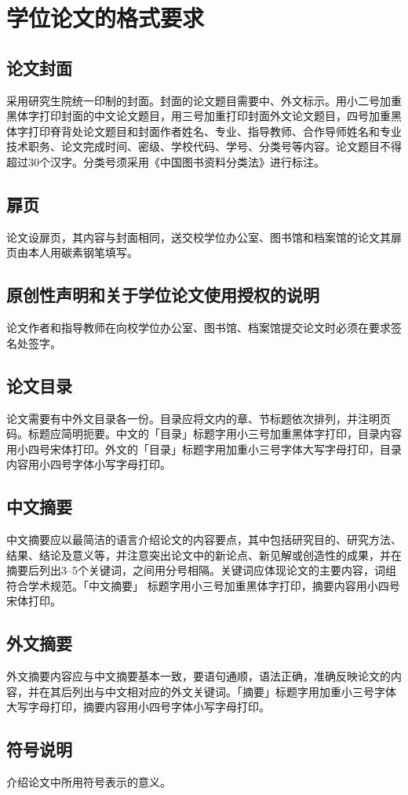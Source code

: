 \documentclass[openany]{sduthesis} %
\begin{document}
\section{学位论文的格式要求}
\subsection{论文封面}
采用研究生院统一印制的封面。封面的论文题目需要中、外文标示。用小二号加重黑体字打印封面的中文论文题目，用三号加重打印封面外文论文题目，四号加重黑体字打印脊背处论文题目和封面作者姓名、专业、指导教师、合作导师姓名和专业技术职务、论文完成时间、密级、学校代码、学号、分类号等内容。论文题目不得超过30个汉字。分类号须采用《中国图书资料分类法》进行标注。
\subsection{扉页}
论文设扉页，其内容与封面相同，送交校学位办公室、图书馆和档案馆的论文其扉页由本人用碳素钢笔填写。
\subsection{原创性声明和关于学位论文使用授权的说明}
论文作者和指导教师在向校学位办公室、图书馆、档案馆提交论文时必须在要求签名处签字。
\subsection{论文目录}
论文需要有中外文目录各一份。目录应将文内的章、节标题依次排列，并注明页码。标题应简明扼要。中文的「目录」标题字用小三号加重黑体字打印，目录内容用小四号宋体打印。外文的「目录」标题字用加重小三号字体大写字母打印，目录内容用小四号字体小写字母打印。
\subsection{中文摘要}
中文摘要应以最简洁的语言介绍论文的内容要点，其中包括研究目的、研究方法、结果、结论及意义等，并注意突出论文中的新论点、新见解或创造性的成果，并在摘要后列出3--5个关键词，之间用分号相隔。关键词应体现论文的主要内容，词组符合学术规范。「中文摘要」 标题字用小三号加重黑体字打印，摘要内容用小四号宋体打印。
\subsection{外文摘要}
外文摘要内容应与中文摘要基本一致，要语句通顺，语法正确，准确反映论文的内容，并在其后列出与中文相对应的外文关键词。「摘要」标题字用加重小三号字体大写字母打印，摘要内容用小四号字体小写字母打印。
\subsection{符号说明}
介绍论文中所用符号表示的意义。
\end{document}
